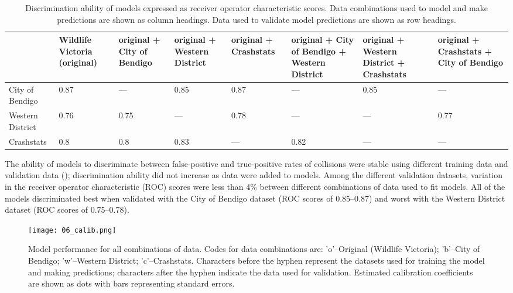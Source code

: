 \begin{table}[!t]
\caption[Discrimination ability of models using all combinations of independent data]{Discrimination ability of models expressed as receiver operator characteristic scores. Data combinations used to model and make predictions are shown as column headings. Data used to validate model predictions are shown as row headings.}
\centering
\begin{tabularx}{0.9\textwidth}{YYYYYYYY} \toprule
	& Wildlife Victoria
(original) & original + City of Bendigo & original + Western District & original + Crashstats & original + City of Bendigo + Western District & original + Western District + Crashstats & original + Crashstats + City of Bendigo \\ 
  \midrule
City of Bendigo & 0.87 & --- & 0.85 & 0.87 & --- & 0.85 & --- \\ 
Western District & 0.76 & 0.75 & --- & 0.78 & --- & --- & 0.77 \\ 
Crashstats & 0.8 & 0.8 & 0.83 & --- & 0.82 & --- & --- \\
\bottomrule
\end{tabularx}
\label{val_glm_roc}
\end{table}

The ability of models to discriminate between false-positive and true-positive rates of collisions were stable using different training data and validation data (); discrimination ability did not increase as data were added to models. Among the different validation datasets, variation in the receiver operator characteristic (ROC) scores were less than 4\% between different combinations of data used to fit models. All of the models discriminated best when validated with the City of Bendigo dataset (ROC scores of 0.85--0.87) and worst with the Western District dataset (ROC scores of 0.75--0.78). 

\begin{figure*}[!t]
  \centering
  \texttt{[image: 06\_calib.png]}
  \caption[Collision model calibration for all combinations of original and independent data]{Model performance for all combinations of data. Codes for data combinations are: 'o'--Original (Wildlife Victoria); 'b'--City of Bendigo; 'w'--Western District; 'c'--Crashstats. Characters before the hyphen represent the datasets used for training the model and making predictions; characters after the hyphen indicate the data used for validation. Estimated calibration coefficients are shown as dots with bars representing standard errors.}
  \label{val_calib}
\end{figure*}

